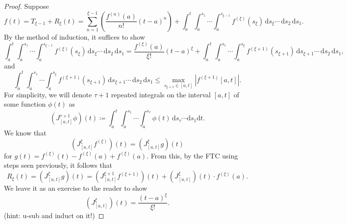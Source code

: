\begin{proof}
	Suppose
	\[
		f(t)=T_{\xi -1}+R_\xi (t)=\sum_{n=1}^{\xi -1} \left( \frac{f^{(n)}(a)}{n!}(t-a)^n\right) + \int_{a}^{t} \int_{a}^{s_1} \cdots \int_{a}^{s_{\xi -1} } f^{(\xi )}(s_\xi ) \,\mathrm{d} s_\xi \cdots \,\mathrm{d} s_2 \,\mathrm{d} s_1
	.\]
	By the method of induction, it suffices to show
	\[
		\int_{a}^{t} \int_{a}^{s_1} \cdots \int_{a}^{s_{\xi -1} } f^{(\xi )}(s_\xi ) \,\mathrm{d} s_\xi \cdots \,\mathrm{d} s_2 \,\mathrm{d} s_1 = \frac{f^{(\xi )}(a)}{\xi !}(t-a)^\xi +\int_{a}^{t} \int_{a}^{s_1} \cdots \int_{a}^{s_{\xi} } f^{(\xi+1 )}(s_{\xi +1} ) \,\mathrm{d} s_{\xi +1} \cdots \,\mathrm{d} s_2 \,\mathrm{d} s_1
	,\]
	and
	\[
		\int_{a}^{t} \int_{a}^{s_1} \cdots \int_{a}^{s_{\xi} } f^{(\xi+1 )}(s_{\xi +1} ) \,\mathrm{d} s_{\xi +1} \cdots \,\mathrm{d} s_2 \,\mathrm{d} s_1\leq \max_{s_{\xi +1}\in[a,t]}\left| f^{(\xi +1)}[a,t] \right| 
	.\]
	For simplicity, we will denote $\tau +1$ repeated integrals on the interval $[a,t]$ of some function $\phi (t)$ as
	\[
		\left(J_{[a,t]}^{\tau +1}\phi\right)(t)\coloneqq \int_{a}^{t} \int_{a}^{s_1}\cdots \int_{a}^{s_\tau  } \phi (t) \,\mathrm{d} s_\tau \cdots \mathrm{d} s_1\mathrm{d} t
	.\]
	We know that
	\[
		\left( J_{[a,t]}^{\xi }f^{(\xi )} \right) (t)=\left( J_{[a,t]}^\xi g \right) (t)	
	\]
	for $g(t)=f^{(\xi )}(t)-f^{(\xi )}(a)+f^{(\xi )}(a)$. From this, by the FTC using steps seen previously, it follows that
	\[
		R_\xi (t)=\left( J_{[a,t]}^{\xi }g \right) (t)=\left( J_{[a,t]}^{\xi +1}f^{(\xi +1)} \right) (t)+\left( J_{[a,t]}^{\xi } \right)(t) \cdot f^{(\xi )}(a)
	.\]
	We leave it as an exercise to the reader to show
	\[
		\left( J^{\xi }_{[a,t]} \right)(t) =\frac{(t-a)^{\xi }}{\xi !}
	.\]
	(hint: u-sub and induct on it!)


\end{proof}
